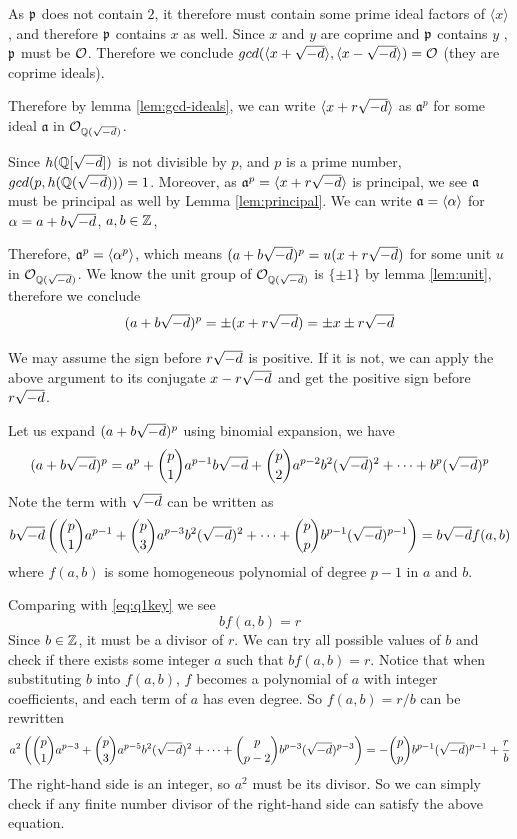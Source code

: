 As $\mathfrak{p}$ does not contain $2$, it therefore must contain some prime ideal factors of $\langle x\rangle$, and therefore $\mathfrak{p}$ contains $x$ as well.
Since $x$ and $y$ are coprime and $\mathfrak{p}$ contains $y$ , $\mathfrak{p}$ must be $\mathcal{O}$.
Therefore we conclude $gcd(\langle x + \sqrt{-d} \rangle, \langle x - \sqrt{-d} \rangle) = \mathcal{O}$ (they are coprime ideals).

Therefore by lemma \ref{lem:gcd-ideals}, we can write $\langle x + r\sqrt{-d} \rangle$ as $\mathfrak{a}^p$ for some ideal $\mathfrak{a}$ in $\mathcal{O}_{\mathbb{Q}(\sqrt{-d})}$. 

Since $h(\mathbb{Q}[\sqrt{-d}])$ is not divisible by $p$, and $p$ is a prime number, $gcd(p, h(\mathbb{Q}(\sqrt{-d})))=1$. 
Moreover, as $\mathfrak{a}^p = \langle x + r\sqrt{-d} \rangle$ is principal, we see $\mathfrak{a}$ must be principal as well by Lemma \ref{lem:principal}.
We can write $\mathfrak{a} = \langle \alpha \rangle$ for $\alpha = a + b\sqrt{-d}$, $a, b \in \mathbb{Z}$, 

Therefore, $\mathfrak{a}^p = \langle \alpha^p \rangle$, which means
$(a + b\sqrt{-d})^p = u(x + r\sqrt{-d})$ for some unit $u$ in $\mathcal{O}_{\mathbb{Q}(\sqrt{-d})}$. 
We know the unit group of $\mathcal{O}_{\mathbb{Q}(\sqrt{-d})}$ is $\{\pm 1\}$ by lemma \ref{lem:unit}, 
therefore we conclude
\begin{equation}\label{eq:q1key}
(a + b\sqrt{-d})^p = \pm(x + r\sqrt{-d}) = \pm x \pm r\sqrt{-d}
\end{equation}

We may assume the sign before $r\sqrt{-d}$ is positive. 
If it is not, we can apply the above argument to its conjugate $x - r\sqrt{-d}$ and get the positive sign before $r\sqrt{-d}$.

Let us expand $(a + b\sqrt{-d})^p$ using binomial expansion, we have
$$
	(a + b\sqrt{-d})^p = a^p + \binom{p}{1} a^{p-1} b \sqrt{-d} + \binom{p}{2} a^{p-2} b^2 (\sqrt{-d})^2 + \cdots + b^p (\sqrt{-d})^p
$$
Note the term with $\sqrt{-d}$ can be written as 
\begin{dmath*}
	b\smd \left( \binom{p}{1} a^{p-1} + \binom{p}{3} a^{p-3} b^2 (\smd)^2 + \cdots + \binom{p}{p} b^{p-1} (\smd)^{p-1} \right) = b \smd f(a, b) 
\end{dmath*}
where $f(a, b)$ is some homogeneous polynomial of degree $p-1$ in $a$ and $b$.

Comparing with \ref{eq:q1key} we see 
\begin{equation}\label{eq:q1-homogeneous}
	b f(a, b) = r
\end{equation}
Since $b \in \mathbb{Z}$, it must be a divisor of $r$.
We can try all possible values of $b$ and check if there exists some integer $a$ such that $b f(a, b) = r$. 
Notice that when substituting $b$ into $f(a, b)$, $f$ becomes a polynomial of $a$ with integer coefficients, and each term of $a$ has even degree. 
So $f(a, b) = r/b$ can be rewritten 
\begin{align*}
	a^2 \left(\binom{p}{1} a^{p-3} + \binom{p}{3} a^{p-5} b^2 (\sqrt{-d})^2 + \cdots + \binom{p}{p-2} b^{p-3} (\sqrt{-d})^{p-3} \right) = -\binom{p}{p} b^{p-1} (\sqrt{-d})^{p-1} + \frac{r}{b}
\end{align*}
The right-hand side is an integer, so $a^2$ must be its divisor. 
So we can simply check if any finite number divisor of the right-hand side can satisfy the above equation.


